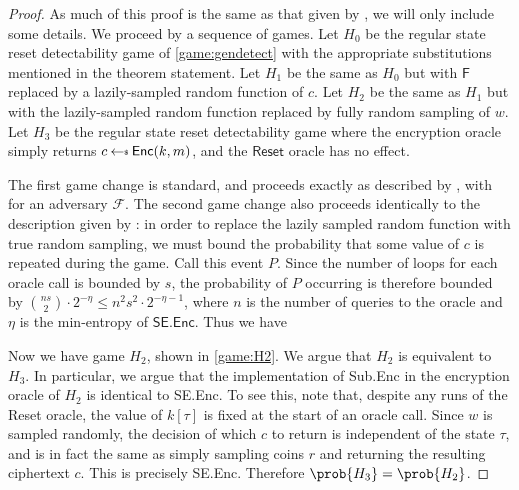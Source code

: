 \begin{proof}
As much of this proof is the same as that given by \cite{CCS:BelJaeKan15}, we will only include some details. We proceed by a sequence of games. Let $H_0$ be the regular state reset detectability game of \autoref{game:gendetect} with the appropriate substitutions mentioned in the theorem statement. Let $H_1$ be the same as $H_0$ but with $\mathsf{F}$ replaced by a lazily-sampled random function of $c$. Let $H_2$ be the same as $H_1$ but with the lazily-sampled random function replaced by fully random sampling of $w$. Let $H_3$ be the regular state reset detectability game where the encryption oracle simply returns $c\sample\textsf{Enc}(k,m)$, and the $\mathsf{Reset}$ oracle has no effect.

The first game change is standard, and proceeds exactly as described by \cite{CCS:BelJaeKan15}, with
for an adversary $\mathcal{F}.$ The second game change also proceeds identically to the description given by \cite{CCS:BelJaeKan15}: in order to replace the lazily sampled random function with true random sampling, we must bound the probability that some value of $c$ is repeated during the game. Call this event $P$. Since the number of loops for each oracle call is bounded by $s$, the probability of $P$ occurring is therefore bounded by $\binom{ns}{2}\cdot 2^{-\eta}\le n^2s^2\cdot 2^{-\eta-1}$, where $n$ is the number of queries to the oracle and $\eta$ is the min-entropy of $\mathsf{SE.Enc}$. Thus we have

Now we have game $H_2$, shown in \autoref{game:H2}. We argue that $H_2$ is equivalent to $H_3$. In particular, we argue that the implementation of \textsf{Sub.Enc} in the encryption oracle of $H_2$ is identical to \textsf{SE.Enc}. To see this, note that, despite any runs of the Reset oracle, the value of $k[\tau]$ is fixed at the start of an oracle call. Since $w$ is sampled randomly, the decision of which $c$ to return is independent of the state $\tau$, and is in fact the same as simply sampling coins $r$ and returning the resulting ciphertext $c$. This is precisely \textsf{SE.Enc}. Therefore $\prob{H_3} = \prob{H_2}$.


\end{proof}
